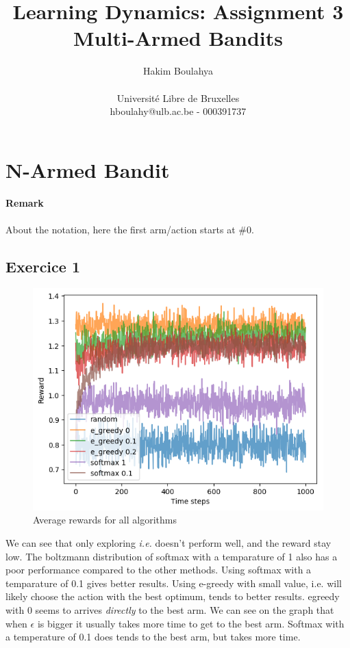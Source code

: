 \documentclass[letterpaper]{article}
\title{Learning Dynamics: Assignment 3 \\
\Large Multi-Armed Bandits}
\author{\Large Hakim Boulahya \\ \\
Université Libre de Bruxelles \\
hboulahy@ulb.ac.be - 000391737
}
\begin{document}
\maketitle
\tableofcontents
\newpage

\section{N-Armed Bandit}

\paragraph{Remark} About the notation, here the first arm/action starts
at \#0.

\subsection{Exercice 1}

\begin{figure}[H]
    \centering
    \includegraphics[width=.7\linewidth]{images/assign3/ex1/rewards}
    \caption{Average rewards for all algorithms}
    \label{fig:rewards_ex1}
\end{figure}

We can see that only exploring \textit{i.e.} doesn't perform well, and
the reward stay low. The boltzmann distribution of softmax with a temparature
of 1 also has a poor performance compared to the other methods. Using softmax
with a temparature of 0.1 gives better results. Using e-greedy with small
value, i.e. will likely choose the action with the best optimum, tends
to better results. egreedy with 0 seems to arrives
\textit{directly} to the best arm. We can see on the graph that when $\epsilon$
is bigger it usually takes more time to get to the best arm.
Softmax with a temperature of 0.1 does tends to the best arm, but takes more
time.
\end{document}
